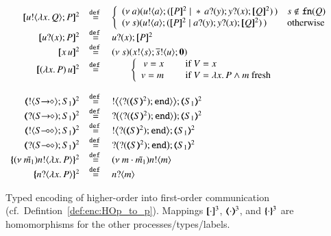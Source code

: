 \begin{figure}[t]
	\[
	\begin{array}{rcl}
		\pmap{\bout{u}{\abs{x}{Q}} P}{2} & \defeq &  \left\{
		\begin{array}{ll}
			\newsp{a}{\bout{u}{a} (\pmap{P}{2} \Par \repl{} \binp{a}{y} \binp{y}{x} \pmap{Q}{2})\,} & s \notin \fn{Q} \\
			\newsp{s}{\bout{u}{a} (\pmap{P}{2} \Par \binp{a}{y} \binp{y}{x} \pmap{Q}{2})\,} & \textrm{otherwise} %
		\end{array}
		\right.
		\\
		\pmap{\binp{u}{x} P}{2} &\defeq&  \binp{u}{x} \pmap{P}{2}
		\\
		\pmap{\appl{x}{u}}{2} & \defeq & \newsp{s}{\bout{x}{s} \bout{\dual{s}}{u} \inact}
		\\
		\pmap{\appl{(\abs{x} P)}{u}}{2} & \defeq & 

		\qquad
		\left\{
		\begin{array}{rcl}
			v = x && \textrm{ if } V = x\\
			v = m && \textrm{ if } V = \abs{x} P \wedge m \textrm{ fresh} \\
		\end{array}
		\right.
		\\
		\\
		\tmap{\btout{\shot{S}}S_1}{2} & \defeq & \bbtout{\chtype{\btinp{\tmap{S}{2}}\tinact}}\tmap{S_1}{2} \\
		\tmap{\btinp{\shot{S}}S_1}{2} & \defeq & \bbtinp{\chtype{\btinp{\tmap{S}{2}}\tinact}}\tmap{S_1}{2} \\

		\tmap{\btout{\lhot{S}}S_1}{2} & \defeq & \bbtout{\btinp{\tmap{S}{2}}\tinact}\tmap{S_1}{2} \\
		\tmap{\btinp{\lhot{S}}S_1}{2} & \defeq & \bbtinp{\btinp{\tmap{S}{2}}\tinact}\tmap{S_1}{2} \\
		\mapa{\news{\tilde{m_1}}\bactout{n}{\abs{ x}{P}} }^{2} &  \defeq & \news{m \cdot \tilde{m_1}} \bactout{n}{m} \\
		\mapa{\bactinp{n}{\abs{ x}{P}} }^{2} &  \defeq & \bactinp{n}{m}
	\end{array}
	\]
	\caption{
		Typed encoding of higher-order  into first-order communication (cf.~Defintion~\ref{def:enc:HOp_to_p}).
		\label{fig:enc:HOp_to_p}
		Mappings 
		$[\!\![\cdot]\!\!]^3$,
		$(\!\!\langle\cdot\rangle\!\!)^3$, 
		and 
		$\{\!\!\{\cdot\}\!\!\}^3$
		are homomorphisms for the other processes/types/labels. 
	}
\end{figure}
